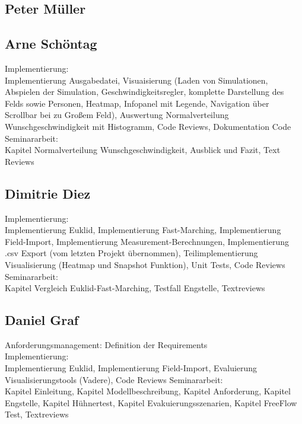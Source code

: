 \subsection{Peter Müller}
\subsection{Arne Schöntag}
Implementierung:\\
Implementierung Ausgabedatei, Visuaisierung (Laden von Simulationen, Abspielen der Simulation, Geschwindigkeitsregler, komplette Darstellung des Felds sowie Personen, Heatmap, Infopanel mit Legende, Navigation über Scrollbar bei zu Großem Feld), Auswertung Normalverteilung Wunschgeschwindigkeit mit Histogramm, Code Reviews, Dokumentation Code
Seminararbeit:\\
Kapitel Normalverteilung Wunschgeschwindigkeit, Ausblick und Fazit, Text Reviews
\subsection{Dimitrie Diez}
Implementierung:\\
Implementierung Euklid, Implementierung Fast-Marching, Implementierung Field-Import, Implementierung Measurement-Berechnungen, Implementierung .csv Export (vom letzten Projekt übernommen), Teilimplementierung Visualisierung (Heatmap und Snapshot Funktion), Unit Tests, Code Reviews\\
Seminararbeit:\\
Kapitel Vergleich Euklid-Fast-Marching, Testfall Engstelle, Textreviews

\subsection{Daniel Graf}
Anforderungsmanagement: Definition der Requirements \\ 
Implementierung:\\
Implementierung Euklid, Implementierung Field-Import, Evaluierung Visualisierungstools (Vadere), Code Reviews 
Seminararbeit:\\
Kapitel Einleitung, Kapitel Modellbeschreibung, Kapitel Anforderung, Kapitel Engstelle, Kapitel Hühnertest, Kapitel Evakuierungsszenarien, Kapitel FreeFlow Test, Textreviews

%




